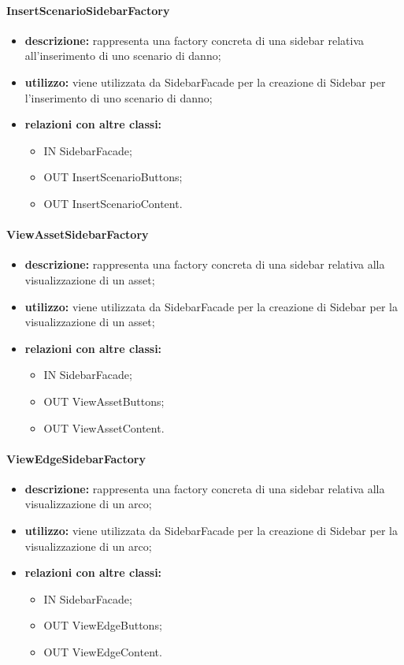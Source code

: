 \paragraph{InsertScenarioSidebarFactory}
\begin{itemize}
	\item \textbf{descrizione:} rappresenta una factory concreta di una sidebar relativa all'inserimento di uno scenario di danno;
	\item \textbf{utilizzo:} viene utilizzata da SidebarFacade per la creazione di Sidebar per l'inserimento di uno scenario di danno;
	\item \textbf{relazioni con altre classi:} 
	\begin{itemize}
		\item IN SidebarFacade;
		\item OUT InsertScenarioButtons;
		\item OUT InsertScenarioContent.
	\end{itemize}
\end{itemize}
\paragraph{ViewAssetSidebarFactory}
\begin{itemize}
	\item \textbf{descrizione:} rappresenta una factory concreta di una sidebar relativa alla visualizzazione di un asset;
	\item \textbf{utilizzo:} viene utilizzata da SidebarFacade per la creazione di Sidebar per la visualizzazione di un asset;
	\item \textbf{relazioni con altre classi:} 
	\begin{itemize}
		\item IN SidebarFacade;
		\item OUT ViewAssetButtons;
		\item OUT ViewAssetContent.
	\end{itemize}
\end{itemize}
\paragraph{ViewEdgeSidebarFactory}
\begin{itemize}
	\item \textbf{descrizione:} rappresenta una factory concreta di una sidebar relativa alla visualizzazione di un arco;
	\item \textbf{utilizzo:} viene utilizzata da SidebarFacade per la creazione di Sidebar per la visualizzazione di un arco;
	\item \textbf{relazioni con altre classi:} 
	\begin{itemize}
		\item IN SidebarFacade;
		\item OUT ViewEdgeButtons;
		\item OUT ViewEdgeContent.
	\end{itemize}
\end{itemize}
